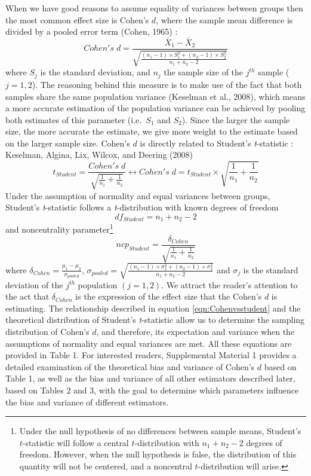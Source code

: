 \documentclass[
  english,
  man,floatsintext]{apa6}
\begin{document}
When we have good reasons to assume equality of variances between groups then the most common effect size is Cohen's \(d\), where the sample mean difference is divided by a pooled error term (Cohen, 1965) :
\begin{equation*} 
Cohen's \; d = \frac{\bar{X}_1-\bar{X}_2}{\sqrt{\frac{(n_1-1) \times S_1^2+(n_2-1) \times S_2^2}{n_1+n_2-2}}}
\label{eqn:Cohends}
\end{equation*}
where \(S_j\) is the standard deviation, and \(n_j\) the sample size of the \(j^{th}\) sample (\(j=1,2\)). The reasoning behind this measure is to make use of the fact that both samples share the same population variance (Keselman et al., 2008), which means a more accurate estimation of the population variance can be achieved by pooling both estimates of this parameter (i.e.~\(S_1\) and \(S_2\)). Since the larger the sample size, the more accurate the estimate, we give more weight to the estimate based on the larger sample size. Cohen's \(d\) is directly related to Student's \emph{t}-statistic : \color{white} Keselman, Algina, Lix, Wilcox, and Deering (2008) \color{black}
\begin{equation} 
t_{Student}=\frac{Cohen's \; d}{\sqrt{\frac{1}{n_1}+\frac{1}{n_2}}}\leftrightarrow Cohen's \; d =  t_{Student} \times \sqrt{\frac{1}{n_1}+\frac{1}{n_2}}
\label{eqn:Cohenvsstudent}
\end{equation}
Under the assumption of normality and equal variances between groups, Student's \emph{t}-statistic follows a \emph{t}-distribution with known degrees of freedom
\begin{equation} 
df_{Student} = n_1+n_2-2
\label{eqn:studentdf}
\end{equation}
and noncentrality parameter\footnote{Under the null hypothesis of no differences between sample means, Student's $t$-statistic will follow a central $t$-distribution with $n_1+n_2-2$ degrees of freedom. However, when the null hypothesis is false, the distribution of this quantity will not be centered, and a noncentral $t$-distribution will arise.}
\[ncp_{Student} = \frac{\delta_{Cohen}}{\sqrt{\frac{1}{n_1}+\frac{1}{n_2}}}\]
where \(\delta_{Cohen}= \frac{\mu_1-\mu_2}{\sigma_{pooled}}\), \(\sigma_{pooled}= \sqrt{\frac{(n_1-1) \times \sigma^2_1+(n_2-1) \times \sigma^2_2}{n_1+n_2-2}}\) and \(\sigma_j\) is the standard deviation of the \(j^{th}\) population \((j=1,2)\). We attract the reader's attention to the act that \(\delta_{Cohen}\) is the expression of the effect size that the Cohen's \(d\) is estimating. The relationship described in equation \ref{eqn:Cohenvsstudent} and the theoretical distribution of Student's \emph{t}-statistic allow us to determine the sampling distribution of Cohen's \(d\), and therefore, its expectation and variance when the assumptions of normality and equal variances are met. All these equations are provided in Table 1. For interested readers, Supplemental Material 1 provides a detailed examination of the theoretical bias and variance of Cohen's \(d\) based on Table 1, as well as the bias and variance of all other estimators described later, based on Tables 2 and 3, with the goal to determine which parameters influence the bias and variance of different estimators.
\end{document}
